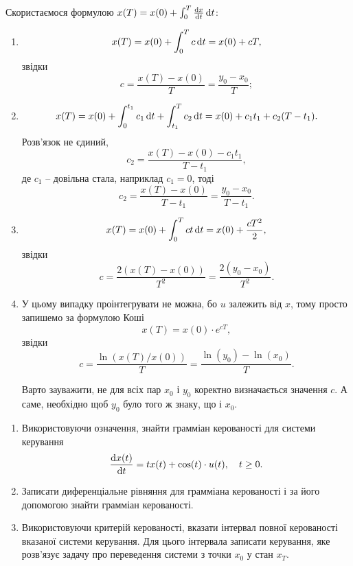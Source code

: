 \begin{solution}
	Скористаємося формулою $x (T) = x (0) + \int_0^T \frac{\mathop{}\!\mathrm{d} x}{\mathop{}\!\mathrm{d} t} \mathop{}\!\mathrm{d} t$:

	\begin{enumerate}
		\item \[x (T) = x (0) + \int_0^T c \mathop{}\!\mathrm{d} t = x (0) + c T,\] звідки \[c = \frac{x (T) - x (0)}{T} = \frac{y_0 - x_0}{T};\]

		\item \[ x (T) = x (0) + \int_0^{t_1} c_1 \mathop{}\!\mathrm{d} t + \int_{t_1}^T c_2 \mathop{}\!\mathrm{d} t = x (0) + c_1 t_1 + c_2 (T - t_1). \] Розв'язок не єдиний, \[ c_2 = \frac{x (T) - x (0) - c_1 t_1}{T - t_1}, \] де $c_1$ -- довільна стала, наприклад $c_1 = 0$, тоді \[ c_2 = \frac{x (T) - x (0)}{T - t_1} = \frac{y_0 - x_0}{T - t_1}. \]

		\item \[ x (T) = x (0) + \int_0^T c t \mathop{}\!\mathrm{d} t = x (0) + \frac{cT^2}{2}, \] звідки \[ c = \frac{2 (x (T) - x (0))}{T^2} = \frac{2 (y_0 - x_0)}{T^2}. \]

		\item У цьому випадку проінтегрувати не можна, бо $u$ залежить від $x$, тому просто запишемо за формулою Коші \[ x (T) = x (0) \cdot e^{c T}, \] звідки \[c = \frac{\ln(x (T) / x (0))}{T} = \frac{\ln(y_0) - \ln(x_0)}{T}. \]

		Варто зауважити, не для всіх пар $x_0$ і $y_0$ коректно визначається значення $c$. А саме, необхідно щоб $y_0$ було того ж знаку, що і $x_0$.
	\end{enumerate}
\end{solution}

\begin{problem}
	\begin{enumerate}
		\item Використовуючи означення, знайти грамміан керованості для системи керування \[ \frac{\mathop{}\!\mathrm{d} x(t)}{\mathop{}\!\mathrm{d} t} = t x (t) + \cos (t) \cdot u(t), \quad t \ge 0. \]

		\item Записати диференціальне рівняння для грамміана керованості і за його допомогою знайти грамміан керованості.

		\item Використовуючи критерій керованості, вказати інтервал повної керованості вказаної системи керування. Для цього інтервала записати керування, яке розв'язує задачу про переведення системи з точки $x_0$ у стан $x_T$.
	\end{enumerate}
\end{problem}

